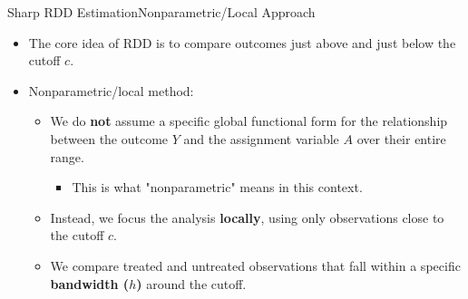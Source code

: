 \documentclass[hyperref={pdfpagelabels=false}]{beamer}
\begin{document}
\begin{frame}{Sharp RDD Estimation}{Nonparametric/Local Approach}
	\begin{itemize}

		\item The core idea of RDD is to compare outcomes just above and just below the cutoff $c$.
		\vspace{0.2cm}
		\item Nonparametric/local method:
		\vspace{0.2cm}
		\begin{itemize}
			\item We do \textbf{not} assume a specific global functional form for the relationship between the outcome $Y$ and the assignment variable $A$ over their entire range. 
						\vspace{0.2cm}
					\begin{itemize}
			\item This is what "nonparametric" means in this context.
			\vspace{0.2cm}
					\end{itemize}
			\item Instead, we focus the analysis \textbf{locally}, using only observations close to the cutoff $c$.
			\vspace{0.2cm}
			\item We compare treated and untreated observations that fall within a specific \textbf{bandwidth ($h$)} around the cutoff.
		\end{itemize}
		
	\end{itemize}
		
		

\end{frame}
\end{document}

